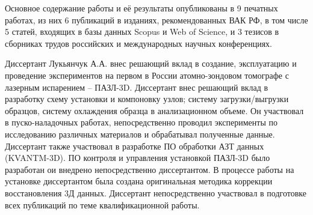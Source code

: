 Основное содержание работы и её результаты опубликованы в 9 печатных работах, из них 6 публикаций в изданиях, рекомендованных ВАК РФ, в том числе 5 статей, входящих в базы данных Scopus и Web of Science, и 3 тезисов в сборниках трудов российских и международных научных конференциях.

{\contribution} Диссертант Лукьянчук А.А. внес решающий вклад в создание, эксплуатацию и проведение экспериментов на первом в России атомно-зондовом томографе с лазерным испарением – ПАЗЛ-3D. Диссертант внес решающий вклад в разработку схему установки и компоновку узлов; систему загрузки/выгрузки образцов, систему охлаждения образца в анализационном объеме. Он участвовал в  пуско-наладочных работах, непосредственно проводил эксперименты по исследованию различных материалов и обрабатывал полученные данные. Диссертант также участвовал в разработке ПО обработки АЗТ данных (KVANTM-3D). ПО контроля и управления установкой ПАЗЛ-3D было разработан ои внедрено непосредственно диссертантом. В процессе работы на установке диссертантом была создана оригинальная методика коррекции восстановления 3Д данных. Диссертант непосредственно участвовал в подготовке всех публикаций по теме квалификационной работы.










